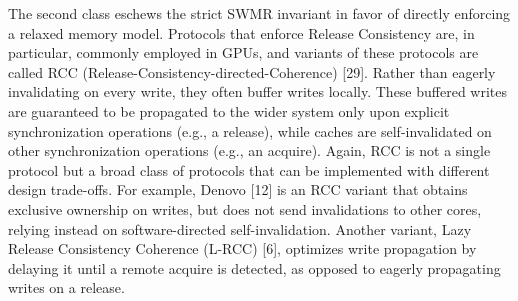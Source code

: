 \documentclass[10pt]{article}
\begin{document}
The second class eschews the strict SWMR invariant in favor of directly enforcing a relaxed memory model. Protocols that enforce Release Consistency are, in particular, commonly employed in GPUs, and variants of these protocols are called RCC (Release-Consistency-directed-Coherence) [29]. Rather than eagerly invalidating on every write, they often buffer writes locally. These buffered writes are guaranteed to be propagated to the wider system only upon explicit synchronization operations (e.g., a release), while caches are self-invalidated on other synchronization operations (e.g., an acquire). Again, RCC is not a single protocol but a broad class of protocols that can be implemented with different design trade-offs. For example, Denovo [12] is an RCC variant that obtains exclusive ownership on writes, but does not send invalidations to other cores, relying instead on software-directed self-invalidation. Another variant, Lazy Release Consistency Coherence (L-RCC) [6], optimizes write propagation by delaying it until a remote acquire is detected, as opposed to eagerly propagating writes on a release.
\end{document}
